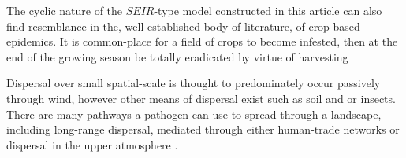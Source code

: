 
The cyclic nature of the $SEIR$-type model constructed in this article can also find resemblance in the, well established body of literature, of crop-based epidemics. It is common-place for a field of crops to become infested, then at the end of the growing season be totally eradicated by virtue of harvesting %






Dispersal over small spatial-scale is thought to predominately occur passively through wind, however other means of dispersal exist such as soil and or insects. There are many pathways a pathogen can use to spread through a landscape, including long-range dispersal, mediated through either human-trade networks %
\cite{hulme2009trade, banks2015role, chapman2017global} or dispersal in the upper atmosphere \cite{westbrook1999atmospheric, isard2005principles}.  

